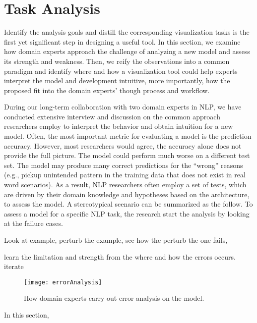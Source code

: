 \section{Task Analysis}
\label{sec:task}
Identify the analysis goals and distill the corresponding visualization tasks is the first yet significant step in designing a useful tool. In this section, we examine how domain experts approach the challenge of analyzing a new model and assess its strength and weakness.
Then, we reify the observations into a common paradigm and identify where and how a visualization tool could help experts interpret the model and development intuitive, more importantly, how the proposed fit into the domain experts' though process and workflow.

During our long-term collaboration with two domain experts in NLP, we have conducted extensive interview and discussion on the common approach researchers employ to interpret the behavior and obtain intuition for a new model.
%
Often, the most important metric for evaluating a model is the prediction accuracy. However, most researchers would agree, the accuracy alone does not provide the full picture. The model could perform much worse on a different test set. The model may produce many correct predictions for the ``wrong'' reasons (e.g., pickup unintended pattern in the training data that does not exist in real word scenarios).
%
As a result, NLP researchers often employ a set of tests, which are driven by their domain knowledge and hypotheses based on the architecture, to assess the model.
%
A stereotypical scenario can be summarized as the follow.
%
To assess a model for a specific NLP task, the research start the analysis by looking at the failure cases.


Look at example, perturb the example, see how the perturb the one fails,

learn the limitation and strength from the where and how the errors occurs. iterate 


\begin{figure}[htbp]
\centering
\vspace{-2mm}
 \texttt{[image: errorAnalysis]}
 \caption{How domain experts carry out error analysis on the model.}
\label{fig:modelPipeline}
\end{figure}

In this section,
